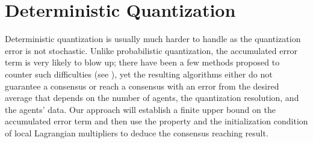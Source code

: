 \documentclass[journal]{IEEEtran}
\begin{document}
\section{Deterministic Quantization} 
\label{sec:DQ}
Deterministic quantization is usually much harder to handle as the quantization error is not stochastic. Unlike probabilistic quantization, the accumulated error term is very likely to blow up; there have been a few methods proposed to counter such difficulties (see \cite{Nedic2009,Chamie2014,Carli2010}), yet the resulting algorithms either do not guarantee a consensus or reach a consensus with an error from the desired average that depends on the number of agents, the quantization resolution, and the agents' data. Our approach will establish a finite upper bound on the accumulated error term and then use the property and the initialization condition of local Lagrangian multipliers to deduce the consensus reaching result.
\end{document}
